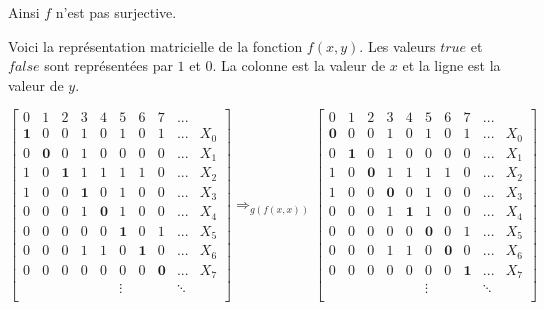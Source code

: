 Ainsi $f$ n'est pas surjective. \qedsymbol
\vspace{0.5cm}

Voici la représentation matricielle de la fonction $f(x,y)$. Les valeurs $true$ et $false$ sont représentées par $1$ et $0$.
La colonne est la valeur de $x$ et la ligne est la valeur de $y$.

\[
\begin{bmatrix}
 0 & 1 & 2 & 3 & 4 & 5 & 6 & 7 &  ... &     \\ 
 \mathbf{1} & 0 & 0 & 1 & 0 & 1 & 0 & 1 &  ... &   X_0 \\
 0 & \mathbf{0} & 0 & 1 & 0 & 0 & 0 & 0 &  ... &   X_1 \\
 1 & 0 & \mathbf{1} & 1 & 1 & 1 & 1 & 0 &  ... &   X_2 \\
 1 & 0 & 0 & \mathbf{1} & 0 & 1 & 0 & 0 &  ... &   X_3 \\
 0 & 0 & 0 & 1 & \mathbf{0} & 1 & 0 & 0 &  ... &   X_4 \\
 0 & 0 & 0 & 0 & 0 & \mathbf{1} & 0 & 1 &  ... &   X_5 \\
 0 & 0 & 0 & 1 & 1 & 0 & \mathbf{1} & 0 &  ... &   X_6 \\
 0 & 0 & 0 & 0 & 0 & 0 & 0 & \mathbf{0} &  ... &   X_7 \\
   &   &   &   &   & \vdots &  &  &\ddots  \\
\end{bmatrix}
\Rightarrow_{g(f(x,x))}
\begin{bmatrix}
 0 & 1 & 2 & 3 & 4 & 5 & 6 & 7 &  ... &     \\ 
 \mathbf{0} & 0 & 0 & 1 & 0 & 1 & 0 & 1 &  ... &   X_0 \\
 0 & \mathbf{1} & 0 & 1 & 0 & 0 & 0 & 0 &  ... &   X_1 \\
 1 & 0 & \mathbf{0} & 1 & 1 & 1 & 1 & 0 &  ... &   X_2 \\
 1 & 0 & 0 & \mathbf{0} & 0 & 1 & 0 & 0 &  ... &   X_3 \\
 0 & 0 & 0 & 1 & \mathbf{1} & 1 & 0 & 0 &  ... &   X_4 \\
 0 & 0 & 0 & 0 & 0 & \mathbf{0} & 0 & 1 &  ... &   X_5 \\
 0 & 0 & 0 & 1 & 1 & 0 & \mathbf{0} & 0 &  ... &   X_6 \\
 0 & 0 & 0 & 0 & 0 & 0 & 0 & \mathbf{1} &  ... &   X_7 \\
   &   &   &   &   & \vdots &  &  &\ddots  \\
\end{bmatrix}
\]


\vspace{0.5cm}


